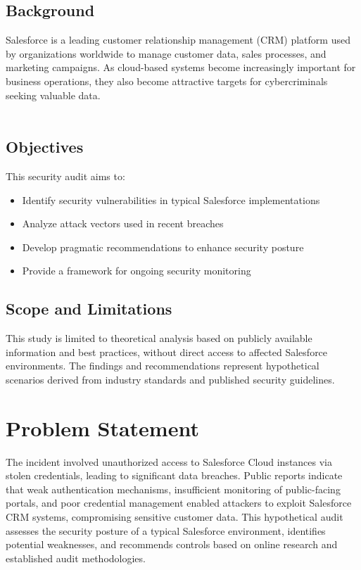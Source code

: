 \documentclass[12pt,a4paper]{article}
\begin{document}
\subsection{Background}
Salesforce is a leading customer relationship management (CRM) platform used by organizations worldwide to manage customer data, sales processes, and marketing campaigns. As cloud-based systems become increasingly important for business operations, they also become attractive targets for cybercriminals seeking valuable data.
\\\\

\subsection{Objectives}
This security audit aims to:
\begin{itemize}
    \item Identify security vulnerabilities in typical Salesforce implementations
    \item Analyze attack vectors used in recent breaches
    \item Develop pragmatic recommendations to enhance security posture
    \item Provide a framework for ongoing security monitoring
\end{itemize}

\subsection{Scope and Limitations}
This study is limited to theoretical analysis based on publicly available information and best practices, without direct access to affected Salesforce environments. The findings and recommendations represent hypothetical scenarios derived from industry standards and published security guidelines.

\section{Problem Statement}
The incident involved unauthorized access to Salesforce Cloud instances via stolen credentials, leading to significant data breaches. Public reports indicate that weak authentication mechanisms, insufficient monitoring of public-facing portals, and poor credential management enabled attackers to exploit Salesforce CRM systems, compromising sensitive customer data. This hypothetical audit assesses the security posture of a typical Salesforce environment, identifies potential weaknesses, and recommends controls based on online research and established audit methodologies.
\end{document}
